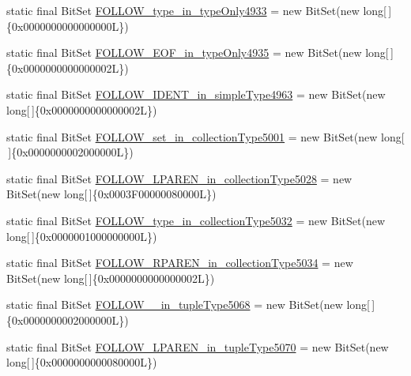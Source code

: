 \begin{DoxyCompactItemize}
\item 
static final Bit\-Set \hyperlink{classorg_1_1tzi_1_1use_1_1parser_1_1soil_1_1_soil_parser_ad80461ffc420b4a91e0c2d201ad1d969}{F\-O\-L\-L\-O\-W\-\_\-type\-\_\-in\-\_\-type\-Only4933} = new Bit\-Set(new long\mbox{[}$\,$\mbox{]}\{0x0000000000000000\-L\})
\item 
static final Bit\-Set \hyperlink{classorg_1_1tzi_1_1use_1_1parser_1_1soil_1_1_soil_parser_a8cf1780d88868edeaaeb77259bc7f743}{F\-O\-L\-L\-O\-W\-\_\-\-E\-O\-F\-\_\-in\-\_\-type\-Only4935} = new Bit\-Set(new long\mbox{[}$\,$\mbox{]}\{0x0000000000000002\-L\})
\item 
static final Bit\-Set \hyperlink{classorg_1_1tzi_1_1use_1_1parser_1_1soil_1_1_soil_parser_a5e43fc95736fbcc03161dc6162f74f7b}{F\-O\-L\-L\-O\-W\-\_\-\-I\-D\-E\-N\-T\-\_\-in\-\_\-simple\-Type4963} = new Bit\-Set(new long\mbox{[}$\,$\mbox{]}\{0x0000000000000002\-L\})
\item 
static final Bit\-Set \hyperlink{classorg_1_1tzi_1_1use_1_1parser_1_1soil_1_1_soil_parser_a4ef9bf34106bd36a35dca21c25b8c9f0}{F\-O\-L\-L\-O\-W\-\_\-set\-\_\-in\-\_\-collection\-Type5001} = new Bit\-Set(new long\mbox{[}$\,$\mbox{]}\{0x0000000002000000\-L\})
\item 
static final Bit\-Set \hyperlink{classorg_1_1tzi_1_1use_1_1parser_1_1soil_1_1_soil_parser_a18c02e86c28749899d6e456a384a355d}{F\-O\-L\-L\-O\-W\-\_\-\-L\-P\-A\-R\-E\-N\-\_\-in\-\_\-collection\-Type5028} = new Bit\-Set(new long\mbox{[}$\,$\mbox{]}\{0x0003\-F00000080000\-L\})
\item 
static final Bit\-Set \hyperlink{classorg_1_1tzi_1_1use_1_1parser_1_1soil_1_1_soil_parser_a338b199f43836a7f9ccbf5e088e5e4e8}{F\-O\-L\-L\-O\-W\-\_\-type\-\_\-in\-\_\-collection\-Type5032} = new Bit\-Set(new long\mbox{[}$\,$\mbox{]}\{0x0000001000000000\-L\})
\item 
static final Bit\-Set \hyperlink{classorg_1_1tzi_1_1use_1_1parser_1_1soil_1_1_soil_parser_a725d24fd9899530058d4c16e30ff082b}{F\-O\-L\-L\-O\-W\-\_\-\-R\-P\-A\-R\-E\-N\-\_\-in\-\_\-collection\-Type5034} = new Bit\-Set(new long\mbox{[}$\,$\mbox{]}\{0x0000000000000002\-L\})
\item 
static final Bit\-Set \hyperlink{classorg_1_1tzi_1_1use_1_1parser_1_1soil_1_1_soil_parser_a67c50327bef52d84a565946f954adc03}{F\-O\-L\-L\-O\-W\-\_\-\_\-in\-\_\-tuple\-Type5068} = new Bit\-Set(new long\mbox{[}$\,$\mbox{]}\{0x0000000002000000\-L\})
\item 
static final Bit\-Set \hyperlink{classorg_1_1tzi_1_1use_1_1parser_1_1soil_1_1_soil_parser_a4c1c2582ce228dd6ea356eff3bc22f58}{F\-O\-L\-L\-O\-W\-\_\-\-L\-P\-A\-R\-E\-N\-\_\-in\-\_\-tuple\-Type5070} = new Bit\-Set(new long\mbox{[}$\,$\mbox{]}\{0x0000000000080000\-L\})

\end{DoxyCompactItemize}
